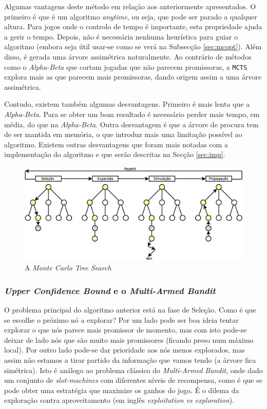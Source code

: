 \documentclass[12pt,a4paper,oneside]{article}
\begin{document}
Algumas vantagens deste método em relação aos anteriormente
apresentados. O primeiro é que é um algoritmo \textit{anytime}, ou
seja, que pode ser parado a qualquer altura. Para jogos onde o
controlo de tempo é importante, esta propriedade ajuda a gerir o
tempo. Depois, não é necessária nenhuma heurística para guiar o
algoritmo (embora seja útil usar-se como se verá na Subsecção
\ref{sec:mcopt}). Além disso, é gerada uma árvore assimétrica
naturalmente. Ao contrário de métodos como o \textit{Alpha-Beta} que
cortam jogadas que não parecem promissoras, a \texttt{MCTS} explora
mais as que parecem mais promissoras, dando origem assim a uma árvore
assimétrica.

Contudo, existem também algumas desvantagens. Primeiro é mais lenta
que a \textit{Alpha-Beta}. Para se obter um bom resultado é necessário
perder mais tempo, em média, do que na \textit{Alpha-Beta}. Outra
desvantagem é que a árvore de procura tem de ser mantida em memória, o
que introduz mais uma limitação possível ao algoritmo. Existem outras
desvantagens que foram mais notadas com a implementação do algoritmo e
que serão descritas na Secção \ref{sec:imp}.

\begin{figure}[!htb]
  \centering
  \includegraphics[width=1\textwidth]{mcts}
  \caption{A \textit{Monte Carlo Tree Search}}
  \label{fig:mcts}
\end{figure}

\subsubsection{\textit{Upper Confidence Bound} e o \textit{Multi-Armed Bandit}}

O problema principal do algoritmo anterior está na fase de
Seleção. Como é que se escolhe o próximo nó a explorar? Por um lado
pode ser boa ideia tentar explorar o que nós parece mais promissor de
momento, mas com isto pode-se deixar de lado nós que são muito mais
promissores (ficando preso num máximo local). Por outro lado pode-se
dar prioridade aos nós menos explorados, mas assim não estamos a tirar
partido da informação que vamos tendo (a árvore fica simétrica). Isto
é análogo ao problema clássico do \textit{Multi-Armed Bandit}, onde
dado um conjunto de \textit{slot-machines} com diferentes níveis de
recompensa, como é que se pode obter uma estratégia que maximize os
ganhos do jogo. É o dilema da exploração contra aproveitamento (em
inglês \textit{exploitation vs exploration}).
\end{document}
